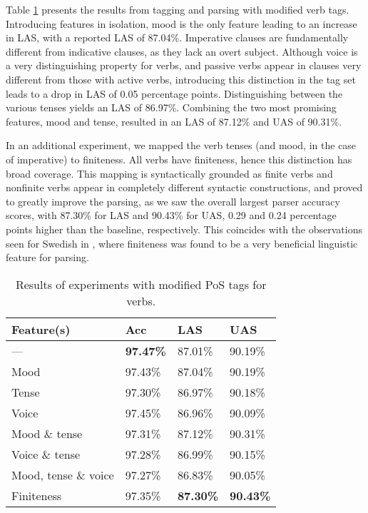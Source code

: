 \documentclass[11pt,a4paper]{article}
\begin{document}
Table \ref{verbresults} presents the results from tagging and parsing with
modified verb tags. Introducing features in isolation, mood is the only feature
leading to an increase in LAS, with a reported LAS of 87.04\%. Imperative
clauses are fundamentally different from indicative clauses, as they lack an
overt subject.  Although voice is a very distinguishing property for verbs, and
passive verbs appear in clauses very different from those with active verbs,
introducing this distinction in the tag set leads to a drop in LAS of 0.05
percentage points.  Distinguishing between the various tenses yields an LAS of
86.97\%. Combining the two most promising features, mood and tense, resulted in
an LAS of 87.12\% and UAS of 90.31\%.

In an additional experiment, we mapped the verb tenses (and mood, in the case
of imperative) to finiteness. All verbs have finiteness, hence this distinction
has broad coverage. This mapping is syntactically grounded as finite verbs and
nonfinite verbs appear in completely different syntactic constructions, and
proved to greatly improve the parsing, as we saw the overall largest parser
accuracy scores, with 87.30\% for LAS and 90.43\% for UAS, 0.29 and 0.24
percentage points higher than the baseline, respectively. This coincides with
the observations seen for Swedish in , where finiteness was
found to be a very beneficial linguistic feature for parsing.

\begin{table}
    \centering
    \smaller[0.5]
    \begin{tabular}{@{}llll@{}}
        \toprule
        \textbf{Feature(s)} & \textbf{Acc} & \textbf{LAS} & \textbf{UAS} \\
        \midrule
        --- & \textbf{97.47\%} & 87.01\% & 90.19\% \\
        Mood & 97.43\% & 87.04\% & 90.19\% \\
        Tense & 97.30\% & 86.97\% & 90.18\% \\
        Voice & 97.45\% & 86.96\% & 90.09\% \\
        Mood \& tense & 97.31\% & 87.12\% & 90.31\% \\
        Voice \& tense & 97.28\% & 86.99\% & 90.15\% \\
        Mood, tense \& voice & 97.27\% & 86.83\% & 90.05\% \\
        Finiteness & 97.35\% & \textbf{87.30\%} & \textbf{90.43\%} \\
        \bottomrule
    \end{tabular}
    \caption{Results of experiments with modified PoS tags for verbs.}
    \label{verbresults}
\end{table}
\end{document}
